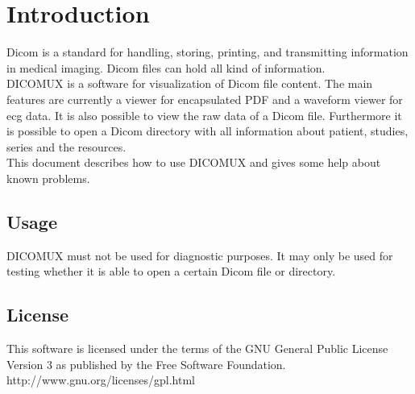 %
%
\chapter{Introduction}
Dicom is a standard for handling, storing, printing, and transmitting
information in medical imaging. Dicom files can hold all kind of information. \\
DICOMUX is a software for visualization of Dicom file content. The main features
are currently a viewer for encapsulated PDF and a waveform viewer for ecg data. 	
It is also possible to view the raw data of a Dicom file. Furthermore it is
possible to open a Dicom directory with all information about patient, studies,
series and the resources. \\
This document describes how to use DICOMUX and gives some help about known problems.

\section{Usage}
DICOMUX must not be used for diagnostic purposes. It may only be used for testing whether it is able to open a certain Dicom file or directory.

\section{License}
This software is licensed under the terms of the GNU General Public License Version 3 as published by the Free Software Foundation. \\
http://www.gnu.org/licenses/gpl.html 
%
%